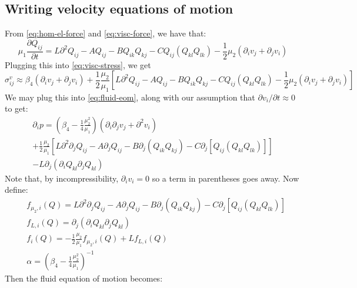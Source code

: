\documentclass[reqno]{article}
\begin{document}
	\subsection{Writing velocity equations of motion}
	From \eqref{eq:hom-el-force} and \eqref{eq:visc-force}, we have that:
	\begin{equation}
		\mu_1 \frac{\partial Q_{ij}}{\partial t}
		= L\partial^2 Q_{ij} 
		- AQ_{ij} - BQ_{ik}Q_{kj} 
		- C Q_{ij} \left( Q_{kl}Q_{lk} \right) 
		- \frac12 \mu_2 \left(\partial_i v_j + \partial_j v_i\right)
	\end{equation}
	Plugging this into \eqref{eq:visc-stress}, we get
	\begin{equation}
		\sigma^v_{ij} \approx 
		\beta_4 \left(\partial_i v_j + \partial_j v_i\right)
		+ \frac12 \frac{\mu_2}{\mu_1} \left[
		L\partial^2 Q_{ij}
		- A Q_{ij}
		- B Q_{ik} Q_{kj}
		- C Q_{ij} \left( Q_{kl} Q_{lk} \right)
		- \frac12 \mu_2 \left( \partial_i v_j + \partial_j v_i \right)
		\right]
	\end{equation}
	We may plug this into \eqref{eq:fluid-eom}, along with our assumption that $\partial v_i/\partial t \approx 0$ to get:
	\begin{multline}
		\partial_i p = 
		\left( \beta_4 - \frac14 \frac{\mu_2^2}{\mu_1} \right)
		\left( \partial_i \partial_j v_j + \partial^2 v_i \right) \\
		+ \frac12 \frac{\mu_2}{\mu_1}
		\left[
		L \partial^2 \partial_j Q_{ij} 
		- A \partial_j Q_{ij}
		- B \partial_j \left( Q_{ik} Q_{kj} \right)
		- C\partial_j \left[ Q_{ij} \left( Q_{kl} Q_{lk} \right) \right]
		\right]\\
		- L\partial_j \left( \partial_i Q_{kl} \partial_j Q_{kl} \right)
	\end{multline}
	Note that, by incompressibility, $\partial_i v_i = 0$ so a term in parentheses goes away. Now define:
	\begin{align}
		&f_{\mu_2, i}(Q) = 
		L \partial^2 \partial_j Q_{ij} 
		- A \partial_j Q_{ij}
		- B \partial_j \left( Q_{ik} Q_{kj} \right)
		- C\partial_j \left[ Q_{ij} \left( Q_{kl} Q_{lk} \right) \right] \\
		&f_{L, i} (Q) = \partial_j \left( \partial_i Q_{kl} \partial_j Q_{kl} \right) \\
		&f_i (Q) = -\frac12 \frac{\mu_2}{\mu_1} f_{\mu_2, i} (Q) + L f_{L, i} (Q) \\
		&\alpha = \left( \beta_4 - \frac14 \frac{\mu_2^2}{\mu_1} \right)^{-1}
	\end{align}
	Then the fluid equation of motion becomes:
\end{document}
